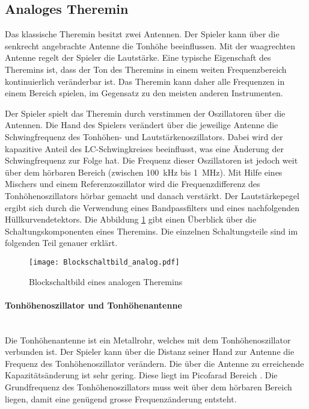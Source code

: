 \subsection{Analoges Theremin}\label{subsec:Theremin_analog}
Das klassische Theremin besitzt zwei Antennen. Der Spieler kann über die senkrecht angebrachte Antenne  die  Tonhöhe beeinflussen. Mit der waagrechten Antenne regelt der Spieler die Lautstärke. Eine typische Eigenschaft des Theremins ist, dass der Ton des Theremins in einem weiten Frequenzbereich kontinuierlich veränderbar ist. Das Theremin kann daher alle Frequenzen in einem Bereich spielen, im Gegensatz zu den meisten anderen Instrumenten.

Der Spieler spielt das Theremin durch verstimmen der Oszillatoren über die Antennen.
Die Hand des Spielers verändert über die jeweilige Antenne die Schwingfrequenz des Tonhöhen- und Lautstärkenoszillators. Dabei wird der kapazitive Anteil des LC-Schwingkreises beeinflusst, was eine Änderung der Schwingfrequenz zur Folge hat. 
Die Frequenz dieser Oszillatoren ist jedoch weit über dem hörbaren Bereich (zwischen \SI{100}{kHz} bis \SI{1}{MHz}). Mit Hilfe eines Mischers und einem Referenzoszillator wird die Frequenzdifferenz des Tonhöhenoszillators hörbar gemacht und danach verstärkt\cite{Franzis}. Der Lautstärkepegel ergibt sich durch die Verwendung eines Bandpassfilters und eines nachfolgenden Hüllkurvendetektors. Die Abbildung \ref{img:Blockschaltbild_analog} gibt einen Überblick über die Schaltungskomponenten eines Theremins. Die einzelnen Schaltungsteile sind im folgenden Teil genauer erklärt.

\begin{figure}[h]
	\centering
	\texttt{[image: Blockschaltbild\_analog.pdf]}
	\caption{Blockschaltbild eines analogen Theremins}
	\label{img:Blockschaltbild_analog}
\end{figure}

\paragraph{Tonhöhenoszillator und Tonhöhenantenne}\mbox{}\\

Die Tonhöhenantenne ist ein Metallrohr, welches mit dem Tonhöhenoszillator verbunden ist.
Der Spieler kann über die Distanz seiner Hand zur Antenne die Frequenz des Tonhöhenoszillator verändern. Die über die Antenne zu erreichende Kapazitätsänderung ist sehr gering. Diese liegt im Picofarad Bereich \cite{physik_theremin}. Die Grundfrequenz des Tonhöhenoszillators muss weit über dem hörbaren Bereich liegen, damit eine genügend grosse Frequenzänderung entsteht.

